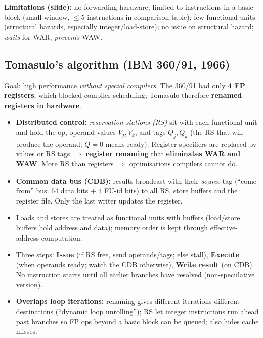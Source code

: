 \textbf{Limitations (slide):} no forwarding hardware; limited to instructions in a basic block (small window, $\le5$ instructions in comparison table); few functional units (structural hazards, especially integer/load-store); no issue on structural hazard; \emph{waits} for WAR; \emph{prevents} WAW.

\subsection{Tomasulo's algorithm (IBM 360/91, 1966)}
Goal: high performance \emph{without special compilers}. The 360/91 had only \textbf{4 FP registers}, which blocked compiler scheduling; Tomasulo therefore \textbf{renamed registers in hardware}.
\begin{itemize}
\item \textbf{Distributed control:} \emph{reservation stations (RS)} sit with each functional unit and hold the op, operand values $V_j,V_k$, and tags $Q_j,Q_k$ (the RS that will produce the operand; $Q=0$ means ready). Register specifiers are replaced by values or RS tags $\Rightarrow$ \textbf{register renaming} that \textbf{eliminates WAR and WAW}. More RS than registers $\Rightarrow$ optimisations compilers cannot do.
\item \textbf{Common data bus (CDB):} results broadcast with their \emph{source} tag (``come-from'' bus: 64 data bits + 4 FU-id bits) to all RS, store buffers and the register file. Only the last writer updates the register.
\item Loads and stores are treated as functional units with buffers (load/store buffers hold address and data); memory order is kept through effective-address computation.
\item Three steps: \textbf{Issue} (if RS free, send operands/tags; else stall), \textbf{Execute} (when operands ready; watch the CDB otherwise), \textbf{Write result} (on CDB). No instruction starts until all earlier branches have resolved (non-speculative version).
\item \textbf{Overlaps loop iterations:} renaming gives different iterations different destinations (``dynamic loop unrolling''); RS let integer instructions run ahead past branches so FP ops beyond a basic block can be queued; also hides cache misses.
\end{itemize}

